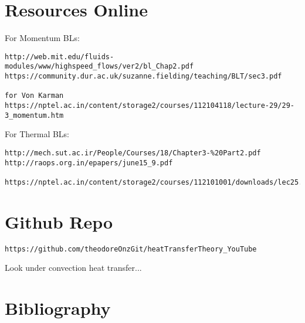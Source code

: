 \documentclass[11pt]{article}
\begin{document}
\part{Resources Online}

For Momentum BLs:
\begin{verbatim}
http://web.mit.edu/fluids-modules/www/highspeed_flows/ver2/bl_Chap2.pdf
https://community.dur.ac.uk/suzanne.fielding/teaching/BLT/sec3.pdf

for Von Karman
https://nptel.ac.in/content/storage2/courses/112104118/lecture-29/29-3_momentum.htm
\end{verbatim}

For Thermal BLs:

\begin{verbatim}
http://mech.sut.ac.ir/People/Courses/18/Chapter3-%20Part2.pdf
http://raops.org.in/epapers/june15_9.pdf

https://nptel.ac.in/content/storage2/courses/112101001/downloads/lec25.pdf
\end{verbatim}

\part{Github Repo}
\begin{verbatim}
https://github.com/theodoreOnzGit/heatTransferTheory_YouTube
\end{verbatim}

Look under convection heat transfer...


\part{Bibliography}

\printbibliography
\end{document}
